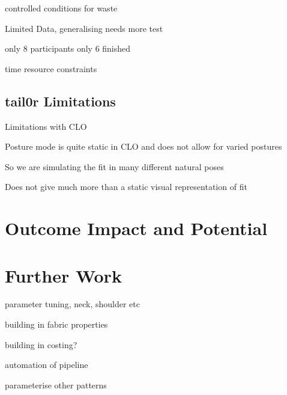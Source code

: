 controlled conditions for waste

Limited Data, generalising needs more test

only 8 participants only 6 finished

time resource constraints

\subsection{tail0r Limitations}
Limitations with CLO

Posture mode is quite static in CLO and does not allow for varied postures

So we are simulating the fit in many different natural poses

Does not give much more than a static visual representation of fit

\section{Outcome Impact and Potential}

\section{Further Work}
parameter tuning, neck, shoulder etc

building in fabric properties

building in costing?

automation of pipeline

parameterise other patterns